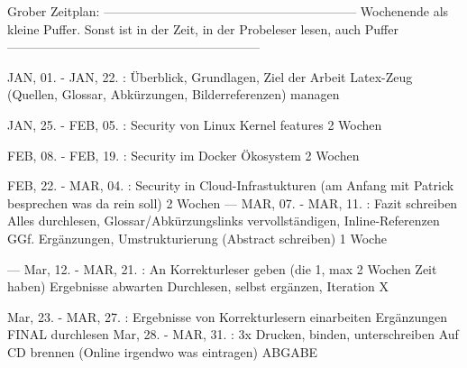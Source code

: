 Grober Zeitplan:
------------------------------------------------------------
Wochenende als kleine Puffer.
Sonst ist in der Zeit, in der Probeleser lesen, auch Puffer
------------------------------------------------------------

JAN, 01. - JAN, 22. : Überblick, Grundlagen, Ziel der Arbeit
                      Latex-Zeug (Quellen, Glossar, Abkürzungen, Bilderreferenzen) managen

JAN, 25. - FEB, 05. : Security von Linux Kernel features
                      2 Wochen

FEB, 08. - FEB, 19. : Security im Docker Ökosystem
                      2 Wochen

FEB, 22. - MAR, 04. : Security in Cloud-Infrastukturen (am Anfang mit Patrick besprechen was da rein soll)
                      2 Wochen
---
MAR, 07. - MAR, 11. : Fazit schreiben
                      Alles durchlesen, Glossar/Abkürzungslinks vervollständigen, Inline-Referenzen
                      GGf. Ergänzungen, Umstrukturierung
                      (Abstract schreiben)
                      1 Woche

---
Mar, 12. - MAR, 21. : An Korrekturleser geben (die 1, max 2 Wochen Zeit haben)
                      Ergebnisse abwarten
                      Durchlesen, selbst ergänzen, Iteration X

Mar, 23. - MAR, 27. : Ergebnisse von Korrekturlesern einarbeiten
                      Ergänzungen
                      FINAL durchlesen
Mar, 28. - MAR, 31. : 3x Drucken, binden, unterschreiben
                      Auf CD brennen
                      (Online irgendwo was eintragen)
                      ABGABE
